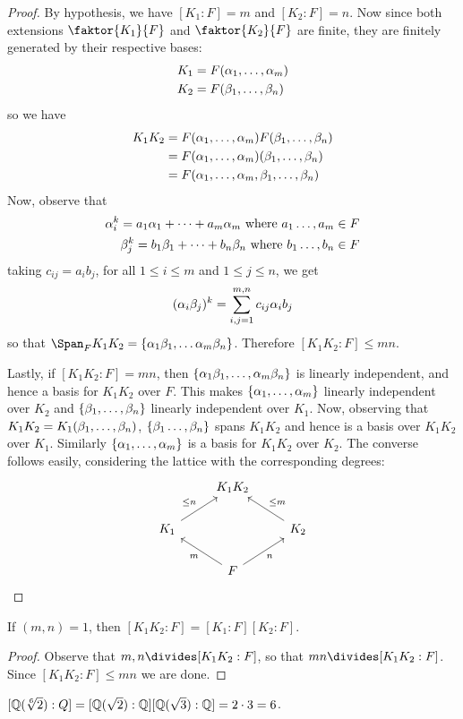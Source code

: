 \begin{proof}
  By hypothesis, we have $[K_1:F]=m$ and $[K_2:F]=n.$ Now since both
  extensions $\faktor{K_1}{F}$ and $\faktor{K_2}{F}$ are finite, they
  are finitely generated by their respective bases:
  \begin{align*}
    K_1 &=  F(\alpha_1, \dots, \alpha_m)  \\
    K_2 &=  F(\beta_1, \dots, \beta_n)  \\
  \end{align*}
  so we have
  \begin{align*}
    K_1K_2  &=  F(\alpha_1, \dots, \alpha_m)F(\beta_1, \dots, \beta_n)  \\
            &= F(\alpha_1, \dots, \alpha_m)(\beta_1, \dots, \beta_n) \\
            &= F(\alpha_1, \dots, \alpha_m, \beta_1, \dots, \beta_n) \\
  \end{align*}
  Now, observe that
  \begin{align*}
    \alpha_i^k=a_1\alpha_1+\dots+a_m\alpha_m \text{ where } a_1 \dots, a_m \in F \\
    \beta_j^k=b_1\beta_1+\dots+b_n\beta_n \text{ where } b_1 \dots, b_n \in F \\
  \end{align*}
  taking $c_{ij}=a_ib_j$, for all $1 \leq i \leq m$ and $1 \leq j \leq n$,
  we get
  \begin{equation*}
    (\alpha_i\beta_j)^k=\sum_{i,j=1}^{m,n}{c_{ij}\alpha_ib_j}
  \end{equation*}
  so that $\Span_F{K_1K_2}=\{\a_1\b_1, \dots \a_m\b_n\}$. Therefore
  $[K_1K_2:F] \leq mn$.

  Lastly, if $[K_1K_2:F]=mn$, then $\{\alpha_1\beta_1, \dots, \alpha_m\beta_n\}$ is
  linearly independent, and hence a basis for $K_1K_2$ over $F$. This
  makes $\{\alpha_1, \dots, \alpha_m\}$ linearly independent over $K_2$ and
  $\{\beta_1, \dots, \beta_n\}$ linearly independent over $K_1$. Now,
  observing that $K_1K_2=K_1(\beta_1, \dots, \beta_n)$, $\{\beta_1 \dots,
  \beta_n\}$ spans $K_1K_2$ and hence is a basis over $K_1K_2$ over $K_1$.
  Similarly $\{\alpha_1, \dots, \alpha_m\}$ is a basis for $K_1K_2$ over
  $K_2$. The converse follows easily, considering the lattice with the
  corresponding degrees:
  \[\begin{tikzcd}
  & {K_1K_2} \\
    {K_1} && {K_2} \\
          & F
          \arrow["{\leq n}", from=2-1, to=1-2]
          \arrow["{\leq m}"', from=2-3, to=1-2]
          \arrow["m", from=3-2, to=2-1]
          \arrow["n"', from=3-2, to=2-3]
  \end{tikzcd}\]
\end{proof}
\begin{corollary}
  If $(m,n)=1$, then $[K_1K_2:F]=[K_1:F][K_2:F]$.
\end{corollary}
\begin{proof}
  Observe that $m,n \divides [K_1K_2:F]$, so that $mn \divides
  [K_1K_2:F]$. Since $[K_1K_2:F] \leq mn$ we are done.
\end{proof}

\begin{example}\label{example_8.11}
  $[\mathbb{Q}(\sqrt[6]{2}):Q]=[\mathbb{Q}(\sqrt{2}):\mathbb{Q}][\mathbb{Q}(\sqrt{3}):\mathbb{Q}]=2 \cdot
  3=6$.
\end{example}
